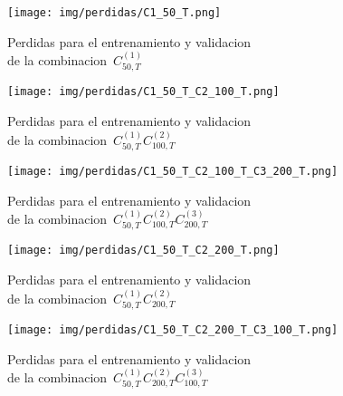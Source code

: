 \begin{figure}[H]
    \centerline{\texttt{[image: img/perdidas/C1\_50\_T.png]}}
    \caption{Perdidas para el entrenamiento y validacion\\ de la combinacion~$C^{(1)}_{50,T}$}
    \label{fig:C1_50_T}
\end{figure}

\begin{figure}[H]
    \centerline{\texttt{[image: img/perdidas/C1\_50\_T\_C2\_100\_T.png]}}
    \caption{Perdidas para el entrenamiento y validacion\\ de la combinacion~$C^{(1)}_{50,T}C^{(2)}_{100,T}$}
    \label{fig:C1_50_T_C2_100_T}
\end{figure}

\begin{figure}[H]
    \centerline{\texttt{[image: img/perdidas/C1\_50\_T\_C2\_100\_T\_C3\_200\_T.png]}}
    \caption{Perdidas para el entrenamiento y validacion\\ de la combinacion~$C^{(1)}_{50,T}C^{(2)}_{100,T}C^{(3)}_{200,T}$}
    \label{fig:C1_50_T_C2_100_T_C3_200_T}
\end{figure}

\begin{figure}[H]
    \centerline{\texttt{[image: img/perdidas/C1\_50\_T\_C2\_200\_T.png]}}
    \caption{Perdidas para el entrenamiento y validacion\\ de la combinacion~$C^{(1)}_{50,T}C^{(2)}_{200,T}$}
    \label{fig:C1_50_T_C2_200_T}
\end{figure}

\begin{figure}[H]
    \centerline{\texttt{[image: img/perdidas/C1\_50\_T\_C2\_200\_T\_C3\_100\_T.png]}}
    \caption{Perdidas para el entrenamiento y validacion\\ de la combinacion~$C^{(1)}_{50,T}C^{(2)}_{200,T}C^{(3)}_{100,T}$}
    \label{fig:C1_50_T_C2_200_T_C3_100_T}
\end{figure}

